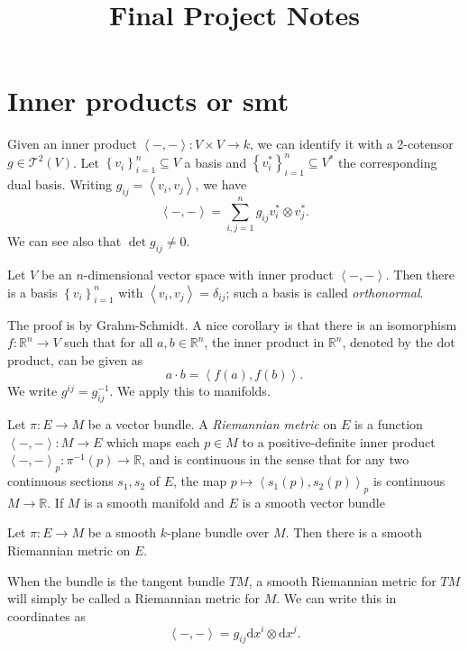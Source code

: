 \documentclass[11pt, letterpaper]{article}
\title{Final Project Notes}
\begin{document}
\makereport
\section{Inner products or smt}
Given an inner product $\left\langle -,- \right\rangle : V\times V \to k$, we can identify it with a 2-cotensor $g\in \mathcal{T} ^2(V)$. Let $\left\{ v_i \right\} _{i=1} ^n\subseteq V$ a basis and $\left\{ v_i^* \right\} _{i=1} ^n \subseteq V^*$ the corresponding dual basis. Writing $g_{ij} =\left\langle v_i,v_j \right\rangle $, we have
\[
	\left\langle -,- \right\rangle =\sum_{i,j=1} ^n g_{ij} v^*_i\otimes v^*_j
.\]
We can see also that $\det g_{ij} \neq 0$.

\begin{proposition}\label{1.1}
	Let $V$ be an $n$-dimensional vector space with inner product $\left\langle -,- \right\rangle $. Then there is a basis $\left\{ v_i \right\} _{i=1} ^n$ with $\left\langle v_i,v_j \right\rangle =\delta _{ij} $; such a basis is called \emph{orthonormal}.
\end{proposition}
The proof is by Grahm-Schmidt. A nice corollary is that there is an isomorphism $f : \mathbb{R} ^n \to V$ such that for all $a,b\in\mathbb{R}^n $, the inner product in $\mathbb{R} ^n$, denoted by the dot product, can be given as
\[
	a\cdot b=\left\langle f(a),f(b) \right\rangle 
.\]
We write $g^{ij} =g_{ij} ^{-1} $. We apply this to manifolds.

\begin{definition}\label{1.2}
	Let $\pi : E \to M$ be a vector bundle. A \emph{Riemannian metric} on $E$ is a function $\left\langle -,- \right\rangle : M \to E$ which maps each $p\in M$ to a positive-definite inner product $\left\langle -,- \right\rangle _p : \pi ^{-1} (p) \to \mathbb{R} $, and is continuous in the sense that for any two continuous sections $s_1,s_2$ of $E$, the map $p\mapsto \left\langle s_1(p),s_2(p) \right\rangle_p$ is continuous $M\to \mathbb{R} $. If $M$ is a smooth manifold and $E$ is a smooth vector bundle
\end{definition}
\begin{theorem}\label{1.3}
	Let $\pi : E \to M$ be a smooth $k$-plane bundle over $M$. Then there is a smooth Riemannian metric on $E$.
\end{theorem}

When the bundle is the tangent bundle $TM$, a smooth Riemannian metric for $TM$ will simply be called a Riemannian metric for $M$. We can write this in coordinates as
\[
	\left\langle -,- \right\rangle =g_{ij} \mathrm{d} x^i\otimes \mathrm{d} x^j
.\]
\end{document}
